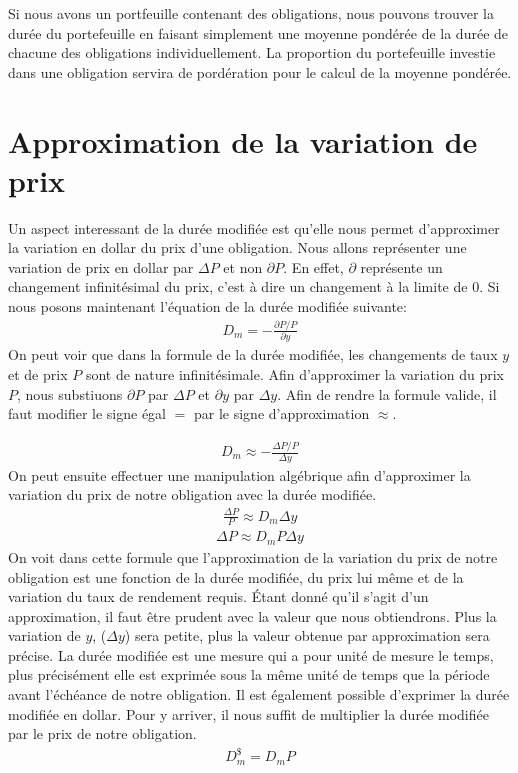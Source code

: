\documentclass[12pt]{article}
\begin{document}
Si nous avons un portfeuille contenant des obligations, nous pouvons trouver la durée du portefeuille en faisant simplement une moyenne pondérée de la durée de chacune des obligations individuellement. La proportion du portefeuille investie dans une obligation servira de pordération pour le calcul de la moyenne pondérée.

\section{Approximation de la variation de prix}
Un aspect interessant de la durée modifiée est qu'elle nous permet d'approximer la variation en dollar du prix d'une obligation.  Nous allons représenter une variation de prix en dollar par $\Delta P$ et non $\partial P$. En effet, $\partial$ représente un changement infinitésimal du prix, c'est à dire un changement à la limite de 0. Si nous posons maintenant l'équation de la durée modifiée suivante:
\begin{align*}
D_m =-\frac{\partial P / P}{\partial y}
\end{align*}
On peut voir que dans la formule de la durée modifiée,  les changements de taux $y$ et de prix $P$ sont de nature infinitésimale.  Afin d'approximer la variation du prix $P$, nous substiuons $\partial P$ par $\Delta P$ et $\partial y$ par $\Delta y$.  Afin de rendre la formule valide,  il faut modifier le signe égal $=$ par le signe d'approximation $\approx$.

\begin{align*}
D_m \approx -\frac{\Delta P / P}{\Delta y}
\end{align*}
On peut ensuite effectuer une manipulation algébrique afin d'approximer la variation du prix de notre obligation avec la durée modifiée.
\begin{align*}
\frac{\Delta P}{P} \approx D_m \Delta y
\end{align*}
\begin{align*}
\Delta P \approx D_m P \Delta y
\end{align*}
On voit dans cette formule que l'approximation de la variation du prix de notre obligation est une fonction de la durée modifiée, du prix lui même et de la variation du taux de rendement requis. Étant donné qu'il s'agit d'un approximation, il faut être prudent avec la valeur que nous obtiendrons. Plus la variation de $y$, ($\Delta y$) sera petite, plus la valeur obtenue par approximation sera précise. La durée modifiée est une mesure qui a pour unité de mesure le temps, plus précisément elle est exprimée sous la même unité de temps que la période avant l'échéance de notre obligation. Il est également possible d'exprimer la durée modifiée en dollar. Pour y arriver, il nous suffit de multiplier la durée modifiée par le prix de notre obligation. 
\begin{align*}
D_m^{\$}=D_m P
\end{align*}
\end{document}
